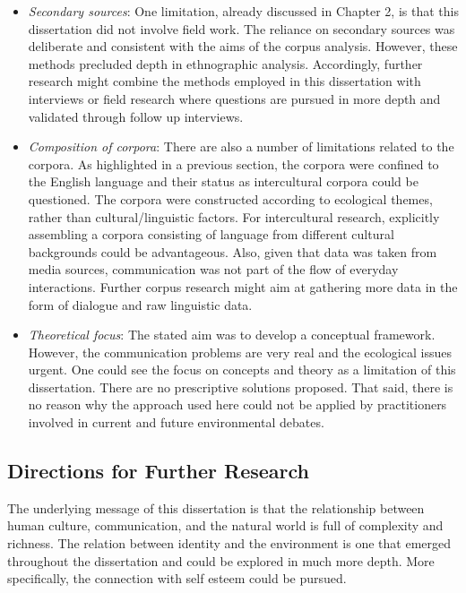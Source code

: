 \begin{itemize}

    \item \textit{Secondary sources}: One limitation, already discussed in Chapter 2, is that this dissertation did not involve field work. The reliance on secondary sources was deliberate and consistent with the aims of the corpus analysis. However, these methods precluded depth in ethnographic analysis. Accordingly, further research might combine the methods employed in this dissertation with interviews or field research where questions are pursued in more depth and validated through follow up interviews. 
    
    \item \textit{Composition of corpora}: There are also a number of limitations related to the corpora. As highlighted in a previous section, the corpora were confined to the English language and their status as intercultural corpora could be questioned. The corpora were constructed according to ecological themes, rather than cultural/linguistic factors. For intercultural research, explicitly assembling a corpora consisting of language from different cultural backgrounds could be advantageous. Also, given that data was taken from media sources, communication was not part of the flow of everyday interactions. Further corpus research might aim at gathering more data in the form of dialogue and raw linguistic data. 
    
    \item \textit{Theoretical focus}: The stated aim was to develop a conceptual framework. However, the communication problems are very real and the ecological issues urgent. One could see the focus on concepts and theory as a limitation of this dissertation. There are no prescriptive solutions proposed. That said, there is no reason why the approach used here could not be applied by practitioners involved in current and future environmental debates. 
    
\end{itemize}

\subsection{Directions for Further Research}

The underlying message of this dissertation is that the relationship between human culture, communication, and the natural world is full of complexity and richness. The relation between identity and the environment is one that emerged throughout the dissertation and could be explored in much more depth. More specifically, the connection with self esteem could be pursued.

